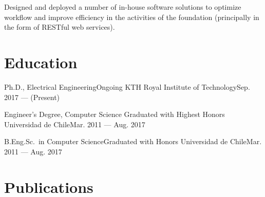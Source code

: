 \documentclass[letterpaper,10pt]{article}
\begin{document}
Designed and deployed a number of in-house software solutions to optimize workflow and improve efficiency in the activities of the foundation (principally in the form of RESTful web services).





\resumeSubHeadingListEnd


\section{Education} 
\resumeSubHeadingListStart
\resumeSubheading
{Ph.D., Electrical Engineering}{Ongoing}
{KTH Royal Institute of Technology}{Sep. 2017 --- (Present)}

\resumeSubheading
{Engineer's Degree, Computer Science} {Graduated with Highest Honors}
{Universidad de Chile}{Mar. 2011 --- Aug. 2017}

\resumeSubheading
{B.Eng.Sc.\ in Computer Science}{Graduated with Honors}
{Universidad de Chile}{Mar. 2011 --- Aug. 2017}
\resumeSubHeadingListEnd

\section{Publications}
\begin{multicols}{2}
\nocite{*}
\printbibliography[heading=none]%
\end{multicols}
\end{document}
